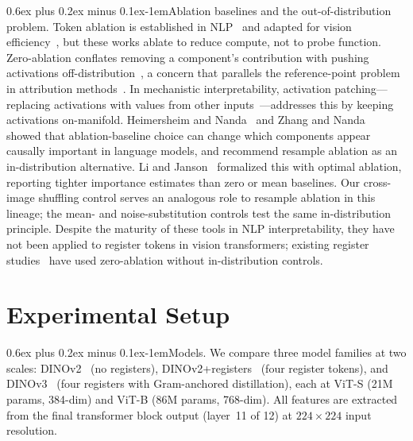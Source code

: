 \documentclass[10pt,twocolumn,letterpaper]{article}
\makeatletter
\renewcommand{\paragraph}{\@startsection{paragraph}{4}{\z@}%
  {0.6ex plus 0.2ex minus 0.1ex}{-1em}{\normalfont\normalsize\bfseries}}
\makeatother
\begin{document}
\paragraph{Ablation baselines and the out-of-distribution problem.}
Token ablation is established in NLP~\cite{michel2019sixteen} and adapted for vision efficiency~\cite{bolya2023tome}, but these works ablate to reduce compute, not to probe function.
Zero-ablation conflates removing a component's contribution with pushing activations off-distribution~\cite{hase2021ood}, a concern that parallels the reference-point problem in attribution methods~\cite{sundararajan2017ig}.
In mechanistic interpretability, activation patching---replacing activations with values from other inputs~\cite{geiger2021causal,meng2022locating}---addresses this by keeping activations on-manifold.
Heimersheim and Nanda~\cite{heimersheim2024activation} and Zhang and Nanda~\cite{zhang2024best} showed that ablation-baseline choice can change which components appear causally important in language models, and recommend resample ablation as an in-distribution alternative.
Li and Janson~\cite{li2024optimal} formalized this with optimal ablation, reporting tighter importance estimates than zero or mean baselines.
Our cross-image shuffling control serves an analogous role to resample ablation in this lineage; the mean- and noise-substitution controls test the same in-distribution principle.
Despite the maturity of these tools in NLP interpretability, they have not been applied to register tokens in vision transformers; existing register studies~\cite{darcet2024registers,jiang2025notrained,yan2025selfdistilled} have used zero-ablation without in-distribution controls.


\section{Experimental Setup}
\label{sec:setup}

\paragraph{Models.}
We compare three model families at two scales: DINOv2~\cite{oquab2024dinov2} (no registers), DINOv2+registers~\cite{darcet2024registers} (four register tokens), and DINOv3~\cite{simeoni2025dinov3} (four registers with Gram-anchored distillation), each at ViT-S (21M params, 384-dim) and ViT-B (86M params, 768-dim).
All features are extracted from the final transformer block output (layer~11 of 12) at $224 \times 224$ input resolution.
\end{document}
